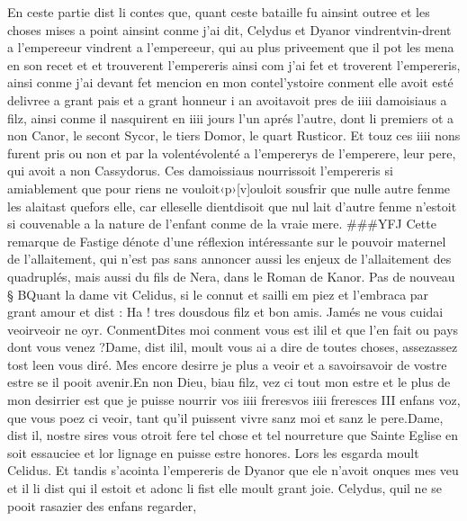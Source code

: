 \documentclass{article}
\begin{document}
\begin{pages}
\pstart En ceste partie dist li contes que, quant ceste bataille fu ainsint outree 
   et les choses mises a point ainsint conme j’ai dit, 
   Celydus 
   et Dyanor 
   vindrentvin-drent a l’empereeur vindrent a 
   l’empereeur,
   qui au plus priveement que il pot les mena en son recet et 
   et
      trouverent l’empereris ainsi com j’ai fet et troverent 
   l’empereris, ainsi conme j’ai devant fet mencion en 
      mon contel'ystoire conment 
   elle avoit esté delivree a grant pais 
   et a grant honneur i an avoitavoit pres 
   de iiii damoisiaus a filz, ainsi conme il nasquirent en iiii jours l’un aprés l’autre, dont li premiers ot a 
   non Canor, le secont Sycor, le tiers 
   Domor, le quart Rusticor. Et touz ces iiii nons 
   furent pris ou non et par la volentévolenté a l'empererys de l’emperere, 
   leur pere, qui avoit a non Cassydorus. 
   Ces damoissiaus nourrissoit l’empereris si amiablement que pour riens ne 
   vouloit‹p›[v]ouloit sousfrir que nulle autre fenme les alaitast 
   quefors elle, car 
   elleselle 
   dientdisoit que nul lait d’autre fenme 
      n’estoit si couvenable a la nature de l’enfant conme de la vraie mere.
   ###YFJ Cette remarque de Fastige dénote d'une réflexion intéressante sur le pouvoir maternel de l'allaitement,
   qui n'est pas sans annoncer aussi les enjeux de l'allaitement des quadruplés, mais aussi du fils de Nera, dans le Roman de Kanor.
 \pend 
\pstart Pas de nouveau § BQuant la dame vit 
   Celidus, si le connut et sailli em piez 
   et l’embraca par grant amour et dist :
   Ha ! tres dousdous filz et bon amis. 
      Jamés ne vous cuidai veoirveoir ne oyr. 
      ConmentDites moi conment vous est 
      ilil et que l'en fait ou pays dont vous venez ?Dame, dist ilil, moult vous ai a dire de 
      toutes choses, 
      assezassez tost 
      leen vous diré. Mes encore desirre je plus 
      a veoir et a 
      savoirsavoir de vostre estre se il pooit avenir.En non Dieu, biau filz, vez ci tout mon estre et le plus de mon desirrier 
      est 
      que je puisse nourrir vos iiii freresvos iiii
         freresces III enfans voz, 
      que vous poez ci veoir, 
   tant qu’il puissent vivre sanz moi et sanz le pere.Dame, dist il, nostre sires vous otroit fere tel chose et tel nourreture que Sainte Eglise en soit 
      essauciee et lor lignage en puisse estre honores.
   Lors les esgarda moult Celidus. Et tandis s’acointa l’empereris 
   de Dyanor que ele n’avoit onques mes veu et il li dist qui il 
      estoit et adonc li fist elle moult grant joie. \pend 
\pstart Celydus, quil ne se pooit rasazier des enfans regarder, 

\end{pages}
\end{document}

